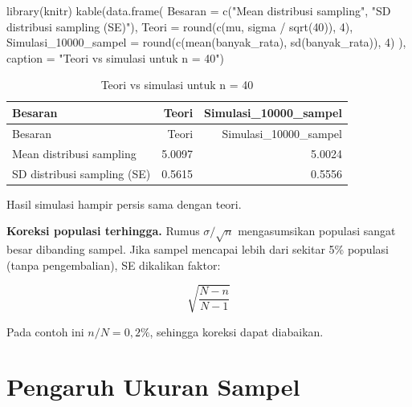 \documentclass[
  indonesian,
  letterpaper,
]{book}
\newenvironment{Shaded}{\begin{snugshade}}{\end{snugshade}}
\newcommand{\AttributeTok}[1]{\textcolor[rgb]{0.40,0.45,0.13}{#1}}
\newcommand{\DecValTok}[1]{\textcolor[rgb]{0.68,0.00,0.00}{#1}}
\newcommand{\FunctionTok}[1]{\textcolor[rgb]{0.28,0.35,0.67}{#1}}
\newcommand{\NormalTok}[1]{\textcolor[rgb]{0.00,0.23,0.31}{#1}}
\newcommand{\SpecialCharTok}[1]{\textcolor[rgb]{0.37,0.37,0.37}{#1}}
\newcommand{\StringTok}[1]{\textcolor[rgb]{0.13,0.47,0.30}{#1}}
\begin{document}
\begin{Shaded}
\begin{Highlighting}[]
\FunctionTok{library}\NormalTok{(knitr)}
\FunctionTok{kable}\NormalTok{(}\FunctionTok{data.frame}\NormalTok{(}
\AttributeTok{Besaran =} \FunctionTok{c}\NormalTok{(}\StringTok{"Mean distribusi sampling"}\NormalTok{, }\StringTok{"SD distribusi sampling (SE)"}\NormalTok{),}
\AttributeTok{Teori =} \FunctionTok{round}\NormalTok{(}\FunctionTok{c}\NormalTok{(mu, sigma }\SpecialCharTok{/} \FunctionTok{sqrt}\NormalTok{(}\DecValTok{40}\NormalTok{)), }\DecValTok{4}\NormalTok{),}
\AttributeTok{Simulasi\_10000\_sampel =} \FunctionTok{round}\NormalTok{(}\FunctionTok{c}\NormalTok{(}\FunctionTok{mean}\NormalTok{(banyak\_rata), }\FunctionTok{sd}\NormalTok{(banyak\_rata)), }\DecValTok{4}\NormalTok{)}
\NormalTok{), }\AttributeTok{caption =} \StringTok{"Teori vs simulasi untuk n = 40"}\NormalTok{)}
\end{Highlighting}
\end{Shaded}

\begin{longtable}[]{@{}lrr@{}}
\caption{Teori vs simulasi untuk n = 40}\tabularnewline
\toprule\noalign{}
Besaran & Teori & Simulasi\_10000\_sampel \\
\midrule\noalign{}
\endfirsthead
\toprule\noalign{}
Besaran & Teori & Simulasi\_10000\_sampel \\
\midrule\noalign{}
\endhead
\bottomrule\noalign{}
\endlastfoot
Mean distribusi sampling & 5.0097 & 5.0024 \\
SD distribusi sampling (SE) & 0.5615 & 0.5556 \\
\end{longtable}

Hasil simulasi hampir persis sama dengan teori.

\textbf{Koreksi populasi terhingga.} Rumus \(\sigma / \sqrt{n}\)
mengasumsikan populasi sangat besar dibanding sampel. Jika sampel
mencapai lebih dari sekitar 5\% populasi (tanpa pengembalian), SE
dikalikan faktor:

\[
\sqrt{\frac{N-n}{N-1}}
\]

Pada contoh ini \(n/N = 0,2\%\), sehingga koreksi dapat diabaikan.

\section{Pengaruh Ukuran Sampel}\label{pengaruh-ukuran-sampel}
\end{document}

